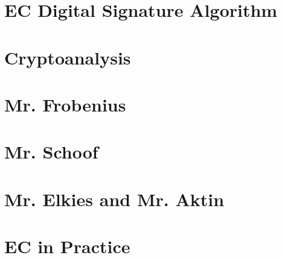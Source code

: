 \documentclass[tikz]{scrreprt}
\begin{document}
\section{EC Digital Signature Algorithm} 
\section{Cryptoanalysis} 
\section{Mr. Frobenius} 
\section{Mr. Schoof} 
\section{Mr. Elkies and Mr. Aktin} 
\section{EC in Practice} 
\end{document}

